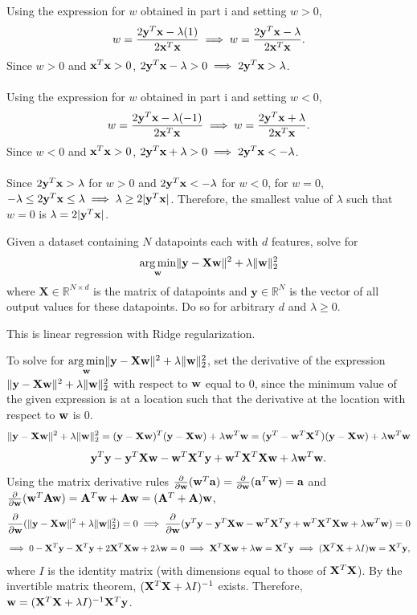 Using the expression for $w$ obtained in part i and setting $w > 0$,
\[ w = \dfrac{2\mathbf{y}^T\mathbf{x} - \lambda(1)}{2\mathbf{x}^T\mathbf{x}} \implies w = \dfrac{2\mathbf{y}^T\mathbf{x} - \lambda}{2\mathbf{x}^T\mathbf{x}}. \]
Since $w > 0$ and $\mathbf{x}^T\mathbf{x} > 0$, $2\mathbf{y}^T\mathbf{x} - \lambda > 0 \implies 2\mathbf{y}^T\mathbf{x} > \lambda$.\\
\\
Using the expression for $w$ obtained in part i and setting $w < 0$,
\[ w = \dfrac{2\mathbf{y}^T\mathbf{x} - \lambda(-1)}{2\mathbf{x}^T\mathbf{x}} \implies w = \dfrac{2\mathbf{y}^T\mathbf{x} + \lambda}{2\mathbf{x}^T\mathbf{x}}. \]
Since $w < 0$ and $\mathbf{x}^T\mathbf{x} > 0$, $2\mathbf{y}^T\mathbf{x} + \lambda > 0 \implies 2\mathbf{y}^T\mathbf{x} < -\lambda$.\\
\\
Since $2\mathbf{y}^T\mathbf{x} > \lambda$ for $w > 0$ and $2\mathbf{y}^T\mathbf{x} < -\lambda$ for $w < 0$, for $w = 0$, $-\lambda \leq 2\mathbf{y}^T\mathbf{x} \leq \lambda \implies \lambda \geq 2\vert \mathbf{y}^T\mathbf{x} \vert$. Therefore, the smallest value of $\lambda$ such that $w = 0$ is $\lambda = 2\vert \mathbf{y}^T\mathbf{x} \vert$.

\subproblem
Given a dataset containing $N$ datapoints each with $d$ features, solve for
\[\underset{\mathbf{w}}{\operatorname{arg\,min}} \Vert\mathbf{y} - \mathbf{X}\mathbf{w}\Vert^2 + \lambda\Vert\mathbf{w}\Vert_2^2
\]
where $\mathbf{X} \in \mathbb{R}^{N \times d}$ is the matrix of datapoints and $\mathbf{y} \in \mathbb{R}^N$ is the  vector of all output values for these datapoints. Do so for arbitrary $d$ and $\lambda \geq 0$.

This is linear regression with Ridge regularization.

To solve for $\underset{\mathbf{w}}{\operatorname{arg\,min}} \Vert \mathbf{y} - \mathbf{X} \mathbf{w} \Vert^2 + \lambda\Vert \mathbf{w}\Vert_2^2$, set the derivative of the expression $\Vert \mathbf{y} - \mathbf{X} \mathbf{w} \Vert^2 + \lambda\Vert \mathbf{w}\Vert_2^2$ with respect to $\mathbf{w}$ equal to 0, since the minimum value of the given expression is at a location such that the derivative at the location with respect to $\mathbf{w}$ is 0.
\[ \Vert \mathbf{y} - \mathbf{X} \mathbf{w} \Vert^2 + \lambda\Vert \mathbf{w}\Vert_2^2 = (\mathbf{y} - \mathbf{X} \mathbf{w})^T(\mathbf{y} - \mathbf{X} \mathbf{w}) + \lambda \mathbf{w}^T\mathbf{w} = (\mathbf{y}^T - \mathbf{w}^T\mathbf{X}^T)(\mathbf{y} - \mathbf{X} \mathbf{w}) + \lambda \mathbf{w}^T\mathbf{w} \]
\[ \mathbf{y}^T\mathbf{y} - \mathbf{y}^T \mathbf{X}\mathbf{w} - \mathbf{w}^T\mathbf{X}^T \mathbf{y} + \mathbf{w}^T\mathbf{X}^T \mathbf{X}\mathbf{w} + \lambda \mathbf{w}^T\mathbf{w}. \]
Using the matrix derivative rules $\frac{\partial}{\partial \mathbf{w}}(\mathbf{w}^T \mathbf{a}) = \frac{\partial}{\partial \mathbf{w}}(\mathbf{a}^T \mathbf{w}) = \mathbf{a}$ and $\frac{\partial}{\partial \mathbf{w}}(\mathbf{w}^T\mathbf{A}\mathbf{w}) = \mathbf{A}^T\mathbf{w} + \mathbf{A}\mathbf{w} = (\mathbf{A}^T + \mathbf{A})\mathbf{w}$,
\[ \frac{\partial}{\partial \mathbf{w}}(\Vert \mathbf{y} - \mathbf{X} \mathbf{w} \Vert^2 + \lambda\Vert \mathbf{w}\Vert_2^2) = 0 \implies \frac{\partial}{\partial \mathbf{w}}(\mathbf{y}^T\mathbf{y} - \mathbf{y}^T \mathbf{X}\mathbf{w} - \mathbf{w}^T\mathbf{X}^T \mathbf{y} + \mathbf{w}^T\mathbf{X}^T \mathbf{X}\mathbf{w} + \lambda \mathbf{w}^T\mathbf{w}) = 0 \]
\[ \implies 0 - \mathbf{X}^T\mathbf{y} - \mathbf{X}^T\mathbf{y} + 2 \mathbf{X}^T\mathbf{X}\mathbf{w} + 2\lambda \mathbf{w} = 0 \implies \mathbf{X}^T\mathbf{X}\mathbf{w} + \lambda\mathbf{w} = \mathbf{X}^T\mathbf{y} \implies (\mathbf{X}^T\mathbf{X} + \lambda I)\mathbf{w} = \mathbf{X}^T\mathbf{y}, \]
where $I$ is the identity matrix (with dimensions equal to those of $\mathbf{X}^T\mathbf{X}$). By the invertible matrix theorem, $(\mathbf{X}^T\mathbf{X} + \lambda I)^{-1}$ exists. Therefore, $\mathbf{w} = (\mathbf{X}^T\mathbf{X} + \lambda I)^{-1}\mathbf{X}^T\mathbf{y}$.

